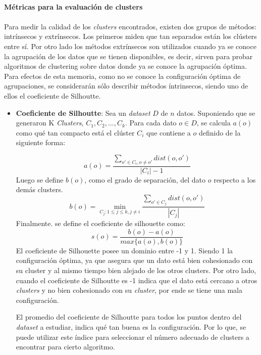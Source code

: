 \paragraph{Métricas para la evaluación de clusters}
\paragraph*{}
    Para medir la calidad de los \textit{clusters} encontrados, existen dos grupos de métodos: intrínsecos y extrínsecos. Los primeros miden que tan separados están los clústers entre sí. Por otro lado los métodos extrínsecos son utilizados cuando ya se conoce la agrupación de los datos que se tienen disponibles, es decir, sirven para probar algoritmos de clustering sobre datos donde ya se conoce la agrupación óptima. Para efectos de esta memoria, como no se conoce la configuración óptima de agrupaciones, se considerarán sólo describir métodos íntrinsecos, siendo uno de ellos el coeficiente de Silhoutte.
    
    \begin{itemize} 
    \item \textbf{Coeficiente de Silhoutte}:
    Sea un \textit{dataset} $D$ de $n$ datos. Suponiendo que se generaron K \textit{Clusters}, $C_1,C_2,...,C_k$. Para cada dato $o \in D$, se calcula $a(o)$ como qué tan compacto está el clúster $C_i$ que contiene a $o$  definido de la siguiente forma:
    
    \begin{equation*}
        a(o) = \frac{\sum_{o' \in C_i, o \neq o'}dist(o,o')}{|C_i| - 1 }
    \end{equation*}
    Luego se define $b(o)$, como el grado de separación, del dato $o$ respecto a los demás clusters.
    \begin{equation*}
        b(o) = \min_{C_j:1\leq j \leq k, j \neq i} \frac{\sum_{o' \in C_j}dist(o,o')}{|C_j|}
    \end{equation*}
    Finalmente. se define el coeficiente de silhouette \cite{rousseeuw1987silhouettes} como:
    \begin{equation*}
        s(o) = \frac{b(o) - a(o)}{max\{a(o),b(o)\}}
    \end{equation*}
    El coeficiente de Silhouette posee un dominio entre -1 y 1. Siendo 1 la configuración óptima, ya que asegura que un dato está bien cohesionado con su cluster y al mismo tiempo bien alejado de los otros clusters. Por otro lado, cuando el coeficiente de Silhoutte es -1 indica que el dato está cercano a otros \textit{clusters} y no bien cohesionado con su \textit{cluster}, por ende se tiene una mala configuración.
    
    El promedio del coeficiente de Silhoutte para todos los puntos dentro del \textit{dataset} a estudiar, indica qué tan buena es la configuración. Por lo que, se puede utilizar este índice para seleccionar el número adecuado de clusters a encontrar para cierto algoritmo. \end{itemize}

